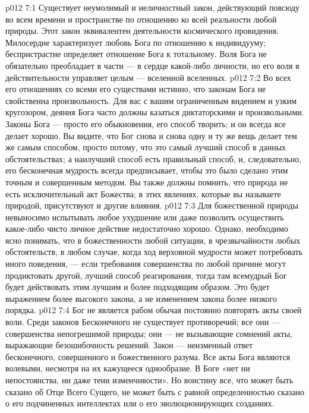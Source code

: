 \vs p012 7:1 Существует неумолимый и неличностный закон, действующий повсюду во всем времени и пространстве по отношению ко всей реальности любой природы. Этот закон эквивалентен деятельности космического провидения. Милосердие характеризует любовь Бога по отношению к индивидууму; беспристрастие определяет отношение Бога к тотальному. Воля Бога не обязательно преобладает в части --- в сердце какой\hyp{}либо личности, но его воля в действительности управляет целым --- вселенной вселенных.
\vs p012 7:2 \pc Во всех его отношениях со всеми его существами истинно, что законам Бога не свойственна произвольность. Для вас с вашим ограниченным видением и узким кругозором, деяния Бога часто должны казаться диктаторскими и произвольными. Законы Бога --- просто его обыкновения, его способ творить; и он всегда все делает хорошо. Вы видите, что Бог снова и снова одну и ту же вещь делает тем же самым способом, просто потому, что это самый лучший способ в данных обстоятельствах; а наилучший способ есть правильный способ, и, следовательно, его бесконечная мудрость всегда предписывает, чтобы это было сделано этим точным и совершенным методом. Вы также должны помнить, что природа не есть исключительный акт Божества; в этих явлениях, которые вы называете природой, присутствуют и другие влияния.
\vs p012 7:3 Для божественной природы невыносимо испытывать любое ухудшение или даже позволить осуществить какое\hyp{}либо чисто личное действие недостаточно хорошо. Однако, необходимо ясно понимать, что  в божественности любой ситуации, в чрезвычайности любых обстоятельств, в любом случае, когда ход верховной мудрости может потребовать иного поведения, --- если требования совершенства по любой причине могут продиктовать другой, лучший способ реагирования, тогда там всемудрый Бог будет действовать этим лучшим и более подходящим образом. Это будет выражением более высокого закона, а не изменением закона более низкого порядка.
\vs p012 7:4 Бог не является рабом обычая постоянно повторять акты своей воли. Среди законов Бесконечного не существует противоречий; все они --- совершенства непогрешимой природы; они --- не вызывающие сомнений акты, выражающие безошибочность решений. Закон --- неизменный ответ бесконечного, совершенного и божественного разума. Все акты Бога являются волевыми, несмотря на их кажущееся однообразие. В Боге «нет ни непостоянства, ни даже тени изменчивости». Но воистину все, что может быть сказано об Отце Всего Сущего, не может быть с равной определенностью сказано о его подчиненных интеллектах или о его эволюционирующих созданиях.
